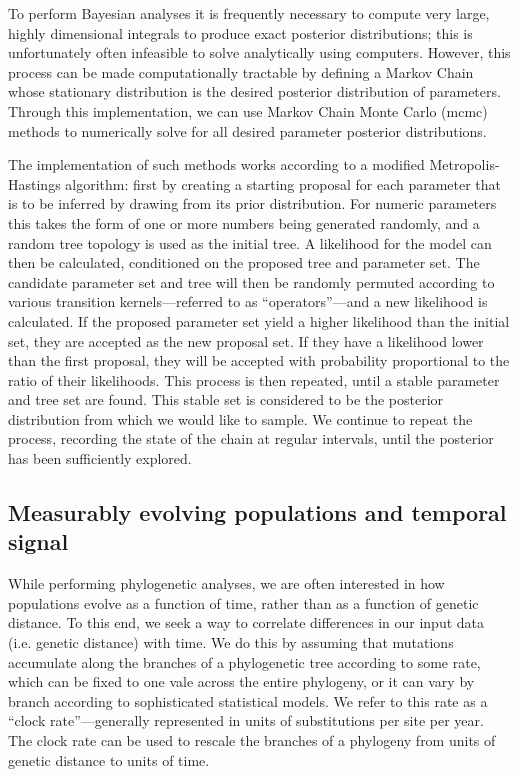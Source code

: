 To perform Bayesian analyses it is frequently necessary to compute very large, highly dimensional integrals to produce exact posterior distributions; this is unfortunately often infeasible to solve analytically using computers.
However, this process can be made computationally tractable by defining a Markov Chain whose stationary distribution is the desired posterior distribution of parameters.
Through this implementation, we can use Markov Chain Monte Carlo (\gls{mcmc}) methods to numerically solve for all desired parameter posterior distributions.

The implementation of such methods works according to a modified Metropolis-Hastings algorithm: first by creating a starting proposal for each parameter that is to be inferred by drawing from its prior distribution.
For numeric parameters this takes the form of one or more numbers being generated randomly, and a random tree topology is used as the initial tree.
A likelihood for the model can then be calculated, conditioned on the proposed tree and parameter set.
The candidate parameter set and tree will then be randomly permuted according to various transition kernels---referred to as ``operators''---and a new likelihood is calculated.
If the proposed parameter set yield a higher likelihood than the initial set, they are accepted as the new proposal set.
If they have a likelihood lower than the first proposal, they will be accepted with probability proportional to the ratio of their likelihoods.
This process is then repeated, until a stable parameter and tree set are found.
This stable set is considered to be the posterior distribution from which we would like to sample.
We continue to repeat the process, recording the state of the chain at regular intervals, until the posterior has been sufficiently explored.

\subsection{Measurably evolving populations and temporal signal}

While performing phylogenetic analyses, we are often interested in how populations evolve as a function of time, rather than as a function of genetic distance.
To this end, we seek a way to correlate differences in our input data (i.e. genetic distance) with time.
We do this by assuming that mutations accumulate along the branches of a phylogenetic tree according to some rate, which can be fixed to one vale across the entire phylogeny\cite{strictClockPaper}, or it can vary by branch according to sophisticated statistical models\cite{unocrrelatedRelaxedClocks, randomLocalClocks}.
We refer to this rate as a ``clock rate''---generally represented in units of substitutions per site per year.
The clock rate can be used to rescale the branches of a phylogeny from units of genetic distance to units of time.

